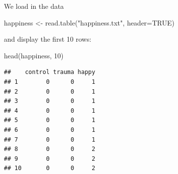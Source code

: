 \documentclass[
  ignorenonframetext,
]{beamer}
\newenvironment{Shaded}{\begin{snugshade}}{\end{snugshade}}
\newcommand{\AttributeTok}[1]{\textcolor[rgb]{0.77,0.63,0.00}{#1}}
\newcommand{\ConstantTok}[1]{\textcolor[rgb]{0.00,0.00,0.00}{#1}}
\newcommand{\DecValTok}[1]{\textcolor[rgb]{0.00,0.00,0.81}{#1}}
\newcommand{\FunctionTok}[1]{\textcolor[rgb]{0.00,0.00,0.00}{#1}}
\newcommand{\NormalTok}[1]{#1}
\newcommand{\OtherTok}[1]{\textcolor[rgb]{0.56,0.35,0.01}{#1}}
\newcommand{\StringTok}[1]{\textcolor[rgb]{0.31,0.60,0.02}{#1}}
\begin{document}
\begin{frame}[fragile]{}
\protect\hypertarget{section}{}
We load in the data

\vspace{12pt}
\tiny

\begin{Shaded}
\begin{Highlighting}[]
\NormalTok{happiness }\OtherTok{\textless{}{-}} \FunctionTok{read.table}\NormalTok{(}\StringTok{"happiness.txt"}\NormalTok{, }\AttributeTok{header=}\ConstantTok{TRUE}\NormalTok{)}
\end{Highlighting}
\end{Shaded}

\vspace{12pt}
\normalsize

and display the first 10 rows:

\vspace{12pt}
\tiny

\begin{Shaded}
\begin{Highlighting}[]
\FunctionTok{head}\NormalTok{(happiness, }\DecValTok{10}\NormalTok{)}
\end{Highlighting}
\end{Shaded}

\begin{verbatim}
##    control trauma happy
## 1        0      0     1
## 2        0      0     1
## 3        0      0     1
## 4        0      0     1
## 5        0      0     1
## 6        0      0     1
## 7        0      0     1
## 8        0      0     2
## 9        0      0     2
## 10       0      0     2
\end{verbatim}
\end{frame}
\end{document}
